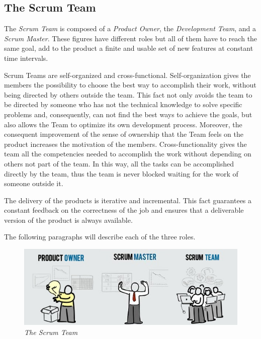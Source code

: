 \newpage

		\subsection{The Scrum Team}\label{ref_scrum_team}
		The \emph{Scrum Team} is composed of a \emph{Product Owner}, the \emph{Development Team}, and a \emph{Scrum Master}.
		These figures have different roles but all of them have to reach the same goal, add to the product a finite and usable set of new features at constant time intervals. %

		Scrum Teams are self-organized and cross-functional. Self-organization gives the members the possibility to choose the best way to accomplish their work, without being directed by others outside the team. This fact not only avoids the team to be directed by someone who has not the technical knowledge to solve specific problems and, consequently, can not find the best ways to achieve the goals, but also allows the Team to optimize its own development process. Moreover, the consequent improvement of the sense of ownership that the Team feels on the product increases the motivation of the members. Cross-functionality gives the team all the competencies needed to accomplish the work without depending on others not part of the team. In this way, all the tasks can be accomplished directly by the team, thus the team is never blocked waiting for the work of someone outside it. 


		The delivery of the products is iterative and incremental. This fact guarantees a constant feedback on the correctness of the job and ensures that a deliverable version of the product is always available.

		The following paragraphs will describe each of the three roles.

		\begin{figure}[h]
		  \begin{center} 
		    \includegraphics[scale=0.75]{images/ch_04/scrum_team_final.jpg}
		  \end{center} 
		  \caption{\textit{The Scrum Team}}  
		  \label{fig:ScrumTeam}
	  	\end{figure}
			


